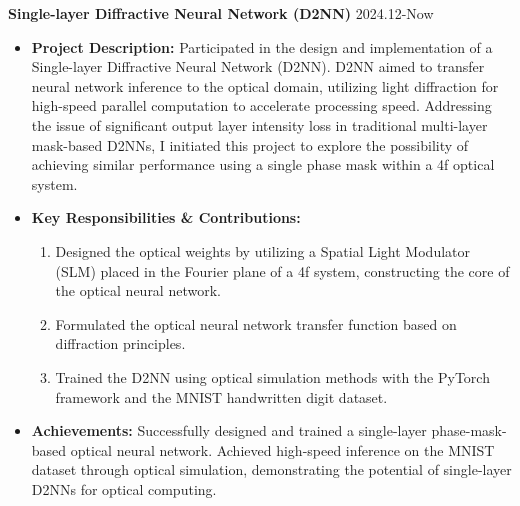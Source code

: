 \documentclass[10pt]{article}
\begin{document}
\noindent \textbf{Single-layer Diffractive Neural Network (D2NN)} \hfill 2024.12-Now\\
\begin{itemize}
    \item \textbf{Project Description:} Participated in the design and implementation of a Single-layer Diffractive Neural Network (D2NN). D2NN aimed to transfer neural network inference to the optical domain, utilizing light diffraction for high-speed parallel computation to accelerate processing speed. Addressing the issue of significant output layer intensity loss in traditional multi-layer mask-based D2NNs, I initiated this project to explore the possibility of achieving similar performance using a single phase mask within a 4f optical system.
    \item \textbf{Key Responsibilities \& Contributions:}\vspace{-0.5\baselineskip} %
    \begin{enumerate} %
        \item Designed the optical weights by utilizing a Spatial Light Modulator (SLM) placed in the Fourier plane of a 4f system, constructing the core of the optical neural network.
        \item Formulated the optical neural network transfer function based on diffraction principles.
        \item Trained the D2NN using optical simulation methods with the PyTorch framework and the MNIST handwritten digit dataset.
    \end{enumerate}
    \vspace{-0.5\baselineskip} %
    \item \textbf{Achievements:} Successfully designed and trained a single-layer phase-mask-based optical neural network. Achieved high-speed inference on the MNIST dataset through optical simulation, demonstrating the potential of single-layer D2NNs for optical computing.
\end{itemize}\vspace{5pt}
\end{document}
